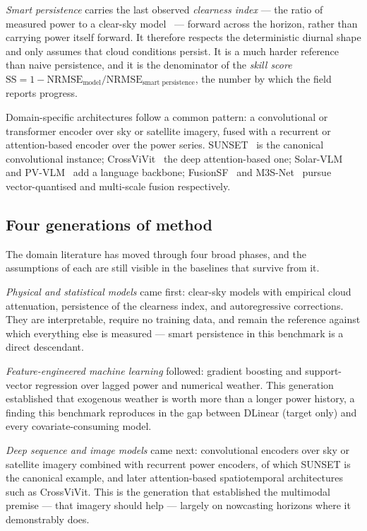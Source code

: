 \emph{Smart persistence} carries the last observed \emph{clearness index} --- the ratio of
measured power to a clear-sky model~\cite{haurwitz} --- forward across the horizon, rather
than carrying power itself forward. It therefore respects the deterministic diurnal shape
and only assumes that cloud conditions persist. It is a much harder reference than naive
persistence, and it is the denominator of the \emph{skill score}
$\mathrm{SS} = 1 - \mathrm{NRMSE}_{\text{model}} / \mathrm{NRMSE}_{\text{smart persistence}}$,
the number by which the field reports progress.

Domain-specific architectures follow a common pattern: a convolutional or transformer
encoder over sky or satellite imagery, fused with a recurrent or attention-based encoder
over the power series. SUNSET~\cite{sunset} is the canonical convolutional instance;
CrossViVit~\cite{crossvivit} the deep attention-based one; Solar-VLM~\cite{solarvlm} and
PV-VLM~\cite{pvvlm} add a language backbone; FusionSF~\cite{fusionsf} and
M3S-Net~\cite{m3snet} pursue vector-quantised and multi-scale fusion respectively.

\subsection{Four generations of method}

The domain literature has moved through four broad phases, and the assumptions of each are
still visible in the baselines that survive from it.

\emph{Physical and statistical models} came first: clear-sky models with empirical cloud
attenuation, persistence of the clearness index, and autoregressive corrections. They are
interpretable, require no training data, and remain the reference against which everything
else is measured --- smart persistence in this benchmark is a direct descendant.

\emph{Feature-engineered machine learning} followed: gradient boosting and support-vector
regression over lagged power and numerical weather. This generation established that
exogenous weather is worth more than a longer power history, a finding this benchmark
reproduces in the gap between DLinear (target only) and every covariate-consuming model.

\emph{Deep sequence and image models} came next: convolutional encoders over sky or satellite
imagery combined with recurrent power encoders, of which SUNSET is the canonical example, and
later attention-based spatiotemporal architectures such as CrossViVit. This is the generation
that established the multimodal premise --- that imagery should help --- largely on
nowcasting horizons where it demonstrably does.

